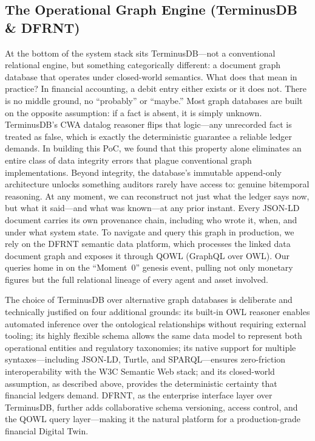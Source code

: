 \documentclass[12pt, a4paper]{article}
\begin{document}
\subsection{The Operational Graph Engine (TerminusDB \& DFRNT)}

At the bottom of the system stack sits TerminusDB---not a conventional relational engine, but something categorically different: a document graph database that operates under closed-world semantics. What does that mean in practice? In financial accounting, a debit entry either exists or it does not. There is no middle ground, no ``probably'' or ``maybe.'' Most graph databases are built on the opposite assumption: if a fact is absent, it is simply unknown. TerminusDB's CWA datalog reasoner flips that logic---any unrecorded fact is treated as false, which is exactly the deterministic guarantee a reliable ledger demands. In building this PoC, we found that this property alone eliminates an entire class of data integrity errors that plague conventional graph implementations. Beyond integrity, the database's immutable append-only architecture unlocks something auditors rarely have access to: genuine bitemporal reasoning. At any moment, we can reconstruct not just what the ledger says now, but what it said---and what was known---at any prior instant. Every JSON-LD document carries its own provenance chain, including who wrote it, when, and under what system state. To navigate and query this graph in production, we rely on the DFRNT semantic data platform, which processes the linked data document graph and exposes it through QOWL (GraphQL over OWL). Our queries home in on the ``Moment~0'' genesis event, pulling not only monetary figures but the full relational lineage of every agent and asset involved.

The choice of TerminusDB over alternative graph databases is deliberate and technically justified on four additional grounds: its built-in OWL reasoner enables automated inference over the ontological relationships without requiring external tooling; its highly flexible schema allows the same data model to represent both operational entities and regulatory taxonomies; its native support for multiple syntaxes---including JSON-LD, Turtle, and SPARQL---ensures zero-friction interoperability with the W3C Semantic Web stack; and its closed-world assumption, as described above, provides the deterministic certainty that financial ledgers demand. DFRNT, as the enterprise interface layer over TerminusDB, further adds collaborative schema versioning, access control, and the QOWL query layer---making it the natural platform for a production-grade financial Digital Twin.
\end{document}
